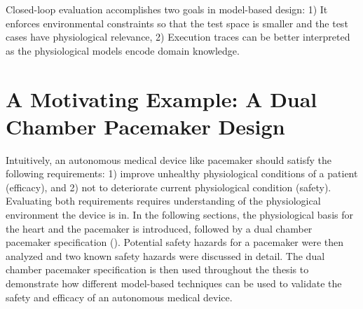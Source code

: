 Closed-loop evaluation accomplishes two goals in model-based design: 1) It enforces environmental constraints so that the test space is smaller and the test cases have physiological relevance, 2) Execution traces can be better interpreted as the physiological models encode domain knowledge. 

\chapter{A Motivating Example: A Dual Chamber Pacemaker Design}
Intuitively, an autonomous medical device like pacemaker should satisfy the following requirements: 1) improve unhealthy physiological conditions of a patient (efficacy), and 2) not to deteriorate current physiological condition (safety).
Evaluating both requirements requires understanding of the physiological environment the device is in.
In the following sections, the physiological basis for the heart and the pacemaker is introduced, followed by a dual chamber pacemaker specification (\cite{compass}).
Potential safety hazards for a pacemaker were then analyzed and two known safety hazards were discussed in detail.
The dual chamber pacemaker specification is then used throughout the thesis to demonstrate how different model-based techniques can be used to validate the safety and efficacy of an autonomous medical device.
